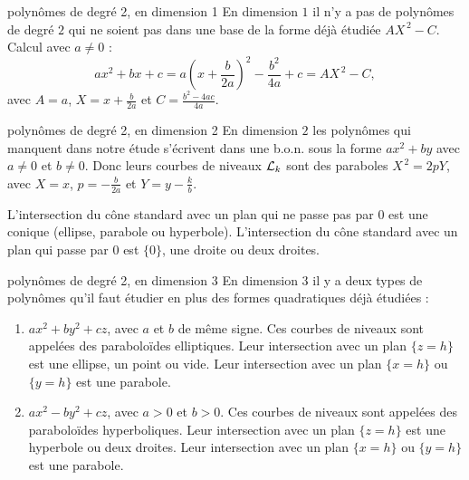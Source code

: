 \documentclass[11pt]{m53beamer}
\begin{document}
\begin{frame}{polynômes de degré 2, en dimension 1}
  En dimension $1$ il n'y a pas de polynômes de degré $2$ qui ne soient pas dans une base de la forme déjà étudiée $AX^{\,2}-C$.\pause\newline
  Calcul avec $a\neq0$ :
  \[
    ax^{2}+bx+c=a(x+\frac{b}{2a})^{2}-\frac{b^{2}}{4a}+c=AX^{\,2}-C,
  \]
  avec $A=a$, $X=x+\frac{b}{2a}$ et $C=\frac{b^{2}-4ac}{4a}$.
\end{frame}

\begin{frame}{polynômes de degré 2, en dimension 2}
  En dimension $2$ les polynômes qui manquent dans notre étude s'écrivent dans une b.o.n. sous la forme $ax^{2}+by$ avec $a\neq0$ et $b\neq0$.\pause\newline
  Donc leurs courbes de niveaux $\mathcal{L}_{k}$ sont des paraboles $X^{\,2}=2pY$, avec $X=x$, $p=-\frac{b}{2a}$ et $Y=y-\frac{k}{b}$.\pause
  \begin{proposition}
    L'intersection du cône standard avec un plan qui ne passe pas par $0$ est une conique (ellipse, parabole ou hyperbole).\pause\newline
    L'intersection du cône standard avec un plan qui passe par $0$ est $\{0\}$, une droite ou deux droites.
  \end{proposition}
\end{frame}

\begin{frame}{polynômes de degré 2, en dimension 3}
  En dimension $3$ il y a deux types de polynômes qu'il faut étudier en plus des formes quadratiques déjà étudiées :
  \begin{enumerate}[<+(1)->]
    \item $ax^{2}+by^{2}+cz$, avec $a$ et $b$ de même signe.\pause{} Ces courbes de niveaux sont appelées des \alert{paraboloïdes elliptiques}.\pause\newline
    Leur intersection avec un plan $\{z=h\}$ est une ellipse\pause, un point ou vide.\pause\newline
    Leur intersection avec un plan $\{x=h\}$ ou $\{y=h\}$ est une parabole.
    \item $ax^{2}-by^{2}+cz$, avec $a>0$ et $b>0$. \pause{} Ces courbes de niveaux sont appelées des \alert{paraboloïdes hyperboliques}.\pause\newline
    Leur intersection avec un plan $\{z=h\}$ est une hyperbole\pause{} ou deux droites.\pause\newline
    Leur intersection avec un plan $\{x=h\}$ ou $\{y=h\}$ est une parabole.
  \end{enumerate}
\end{frame}
\end{document}
